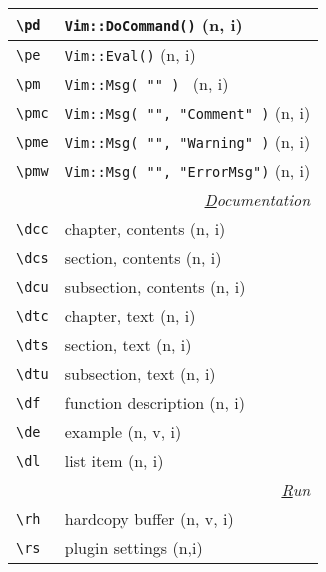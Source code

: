 \documentclass[oneside,10pt,landscape,DIV16]{scrartcl}
\begin{document}
\begin{multicols}{3}
\begin{center}
\begin{tabular}[]{|p{11mm}|p{60mm}|}
\hline \verb'\pd'   & \texttt{Vim::DoCommand()} \hfill (n, i)\\
\hline \verb'\pe'   & \texttt{Vim::Eval()} \hfill (n, i)\\
\hline \verb'\pm'   & \texttt{Vim::Msg( "" )           } \hfill (n, i)\\
\hline \verb'\pmc'  & \texttt{Vim::Msg( "", "Comment" )} \hfill (n, i)\\
\hline \verb'\pme'  & \texttt{Vim::Msg( "", "Warning" )} \hfill (n, i)\\
\hline \verb'\pmw'  & \texttt{Vim::Msg( "", "ErrorMsg")} \hfill (n, i)\\
\hline
\hline
\multicolumn{2}{|r|}{\textsl{\underline{D}ocumentation}}                 \\[1.0ex]
\hline \verb'\dcc' & chapter, contents             \hfill (n, i)\\
\hline \verb'\dcs' & section, contents             \hfill (n, i)\\
\hline \verb'\dcu' & subsection, contents          \hfill (n, i)\\
\hline \verb'\dtc' & chapter, text                 \hfill (n, i)\\
\hline \verb'\dts' & section, text                 \hfill (n, i)\\
\hline \verb'\dtu' & subsection, text              \hfill (n, i)\\
\hline \verb'\df'  & function description          \hfill (n, i)\\
\hline \verb'\de'  & example                       \hfill (n, v, i)\\
\hline \verb'\dl'  & list item                     \hfill (n, i)\\
\hline
\hline
\multicolumn{2}{|r|}{\textsl{\underline{R}un}} \\[1.0ex]
\hline \verb'\rh'    & hardcopy buffer                          \hfill (n, v, i)\\
\hline \verb'\rs'    & plugin settings \hfill (n,i)\\
\hline
\end{tabular}\\
%
%
\end{center}%
\end{multicols}%
%
\end{document}
